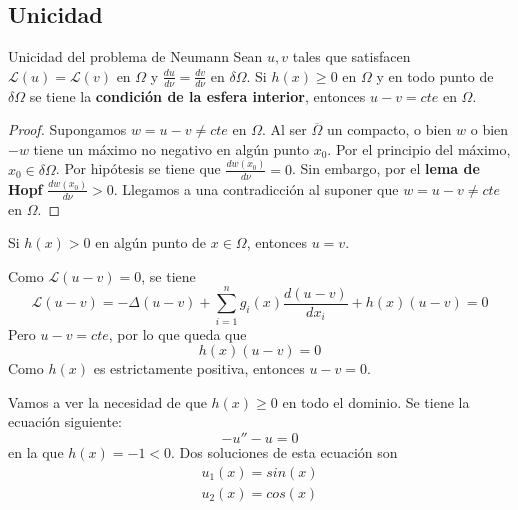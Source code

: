 \subsection{Unicidad}
\begin{prop}{Unicidad del problema de Neumann}
Sean $u,v$ tales que satisfacen $\mathcal{L}(u)=\mathcal{L}(v)$ en $\Omega$ y $\frac{du}{d\nu} = \frac{dv}{d\nu}$ en $\delta\Omega$.
Si $h(x)\ge0$ en $\Omega$ y en todo punto de $\delta\Omega$ se tiene la \textbf{condición de la esfera interior}, entonces $u-v=cte$ en $\Omega$.
\end{prop}
\begin{proof}
Supongamos $w=u-v\neq cte$ en $\Omega$. Al ser $\overline{\Omega}$ un compacto, o bien $w$ o bien $-w$ tiene un máximo no negativo en algún punto $x_0$. Por el principio del máximo, $x_0\in\delta\Omega$.
Por hipótesis se tiene que $\frac{dw(x_0)}{d\nu} = 0$. Sin embargo, por el \textbf{lema de Hopf} $\frac{dw(x_0)}{d\nu} > 0$. Llegamos a una contradicción al suponer que $w=u-v\neq cte$ en $\Omega$.
\end{proof}
\see
\noindent Si $h(x) > 0$ en algún punto de $x\in\Omega$, entonces $u=v$.

\noindent Como $\mathcal{L}(u-v) = 0$, se tiene
$$\mathcal{L}(u-v) = -\Delta (u-v) + \sum_{i=1}^n g_i(x)\frac{d(u-v)}{dx_i} + h(x)(u-v) = 0$$
Pero $u-v=cte$, por lo que queda que
$$h(x)(u-v) = 0$$ Como $h(x)$ es estrictamente positiva, entonces $u-v=0$.

\example
Vamos a ver la necesidad de que $h(x)\ge 0$ en todo el dominio.
Se tiene la ecuación siguiente:
$$-u''-u=0$$
en la que $h(x) = -1 < 0$.
Dos soluciones de esta ecuación son
\begin{equation*}
\begin{array}{l}
u_1(x) = sin(x)\\
u_2(x) = cos(x)\\
\end{array}
\end{equation*}

